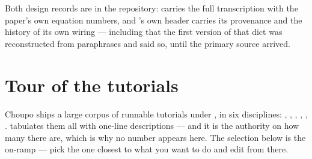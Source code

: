 \documentclass[11pt,a4paper]{article}
\begin{document}
Both design records are in the repository:
 carries the full
transcription with the paper's own equation numbers, and
's own  header carries its provenance and
the history of its own wiring --- including that the first version of that
dict was reconstructed from paraphrases and said so, until the primary
source arrived.

\section{Tour of the tutorials}\label{sec:tutorials}

\begin{whatyoulllearn}
Choupo ships a large corpus of runnable tutorials under
, in six disciplines: , ,
, , , .
 tabulates them all with one-line descriptions --- and it
is the authority on how many there are, which is why no number appears
here.  The selection below is the on-ramp ---
pick the one closest to what you want to do and edit from there.
\end{whatyoulllearn}
\end{document}

